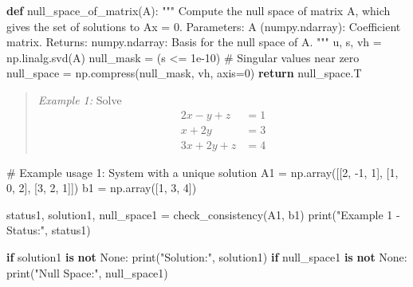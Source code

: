 \documentclass[
  letterpaper,
  DIV=11,
  numbers=noendperiod]{scrreprt}
\newenvironment{Shaded}{\begin{snugshade}}{\end{snugshade}}
\newcommand{\BuiltInTok}[1]{\textcolor[rgb]{0.00,0.23,0.31}{#1}}
\newcommand{\CommentTok}[1]{\textcolor[rgb]{0.37,0.37,0.37}{#1}}
\newcommand{\ControlFlowTok}[1]{\textcolor[rgb]{0.00,0.23,0.31}{\textbf{#1}}}
\newcommand{\DecValTok}[1]{\textcolor[rgb]{0.68,0.00,0.00}{#1}}
\newcommand{\FloatTok}[1]{\textcolor[rgb]{0.68,0.00,0.00}{#1}}
\newcommand{\KeywordTok}[1]{\textcolor[rgb]{0.00,0.23,0.31}{\textbf{#1}}}
\newcommand{\NormalTok}[1]{\textcolor[rgb]{0.00,0.23,0.31}{#1}}
\newcommand{\OperatorTok}[1]{\textcolor[rgb]{0.37,0.37,0.37}{#1}}
\newcommand{\StringTok}[1]{\textcolor[rgb]{0.13,0.47,0.30}{#1}}
\newcommand{\VariableTok}[1]{\textcolor[rgb]{0.07,0.07,0.07}{#1}}
\theoremstyle{plain}
\theoremstyle{definition}
\theoremstyle{remark}
\begin{document}
\begin{Shaded}
\begin{Highlighting}[]
\KeywordTok{def}\NormalTok{ null\_space\_of\_matrix(A):}
    \CommentTok{"""}
\CommentTok{    Compute the null space of matrix A, which gives the set of solutions to Ax = 0.}
\CommentTok{    }
\CommentTok{    Parameters:}
\CommentTok{    A (numpy.ndarray): Coefficient matrix.}
\CommentTok{    }
\CommentTok{    Returns:}
\CommentTok{    numpy.ndarray: Basis for the null space of A.}
\CommentTok{    """}
\NormalTok{    u, s, vh }\OperatorTok{=}\NormalTok{ np.linalg.svd(A)}
\NormalTok{    null\_mask }\OperatorTok{=}\NormalTok{ (s }\OperatorTok{\textless{}=} \FloatTok{1e{-}10}\NormalTok{)  }\CommentTok{\# Singular values near zero}
\NormalTok{    null\_space }\OperatorTok{=}\NormalTok{ np.compress(null\_mask, vh, axis}\OperatorTok{=}\DecValTok{0}\NormalTok{)}
    \ControlFlowTok{return}\NormalTok{ null\_space.T}
\end{Highlighting}
\end{Shaded}

\begin{quote}
\emph{Example 1:} Solve \begin{align*}
2x-y+z&=1\\
x+2y&=3\\ 
3x+2y+z&=4
\end{align*}
\end{quote}

\begin{Shaded}
\begin{Highlighting}[]
\CommentTok{\# Example usage 1: System with a unique solution}
\NormalTok{A1 }\OperatorTok{=}\NormalTok{ np.array([[}\DecValTok{2}\NormalTok{, }\OperatorTok{{-}}\DecValTok{1}\NormalTok{, }\DecValTok{1}\NormalTok{], [}\DecValTok{1}\NormalTok{, }\DecValTok{0}\NormalTok{, }\DecValTok{2}\NormalTok{], [}\DecValTok{3}\NormalTok{, }\DecValTok{2}\NormalTok{, }\DecValTok{1}\NormalTok{]])}
\NormalTok{b1 }\OperatorTok{=}\NormalTok{ np.array([}\DecValTok{1}\NormalTok{, }\DecValTok{3}\NormalTok{, }\DecValTok{4}\NormalTok{])}

\NormalTok{status1, solution1, null\_space1 }\OperatorTok{=}\NormalTok{ check\_consistency(A1, b1)}
\BuiltInTok{print}\NormalTok{(}\StringTok{"Example 1 {-} Status:"}\NormalTok{, status1)}

\ControlFlowTok{if}\NormalTok{ solution1 }\KeywordTok{is} \KeywordTok{not} \VariableTok{None}\NormalTok{:}
    \BuiltInTok{print}\NormalTok{(}\StringTok{"Solution:"}\NormalTok{, solution1)}
\ControlFlowTok{if}\NormalTok{ null\_space1 }\KeywordTok{is} \KeywordTok{not} \VariableTok{None}\NormalTok{:}
    \BuiltInTok{print}\NormalTok{(}\StringTok{"Null Space:"}\NormalTok{, null\_space1)}
\end{Highlighting}
\end{Shaded}
\end{document}
